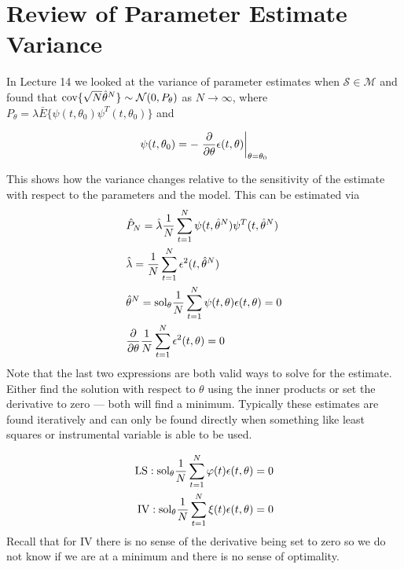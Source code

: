\mainmatter%
\setcounter{page}{1}

\lectureseries[\course]{\course}

\date{November 17, 2009}

\setaddress%

\setcounter{lecture}{14}
\setcounter{chapter}{14}


\section{Review of Parameter Estimate Variance}
In Lecture 14 we looked at the variance of parameter estimates when $\mathcal{S}\in\mathcal{M}$ and found that $\text{cov}\{\sqrt{N}\hat{\theta}^N\} \sim \mathcal{N}(0,P_\theta)$ as $N\to\infty$, where $P_\theta = \lambda\bar{E}\{\psi(t,\theta_0)\psi^T(t,\theta_0)\}$ and

\begin{equation*}
\psi(t,\theta_0) = -\left.\frac{\partial}{\partial\theta}\epsilon(t,\theta)\right|_{\theta=\theta_0}
\end{equation*}

This shows how the variance changes relative to the sensitivity of the estimate with respect to the parameters and the model.
This can be estimated via
\begin{align*}
&\hat{P}_N = \hat{\lambda}\frac{1}{N}\sum_{t=1}^N\psi(t,\hat{\theta}^N)\psi^T(t,\hat{\theta}^N) \\
&\hat{\lambda} = \frac{1}{N}\sum_{t=1}^N\epsilon^2(t,\hat{\theta}^N) \\
&\hat{\theta}^N = \text{sol}_\theta\frac{1}{N}\sum_{t=1}^N\psi(t,\theta)\epsilon(t,\theta) = 0 \\
&\frac{\partial}{\partial\theta}\frac{1}{N}\sum_{t=1}^N\epsilon^2(t,\theta) = 0
\end{align*}
Note that the last two expressions are both valid ways to solve for the estimate.
Either find the solution with respect to $\theta$ using the inner products or set the derivative to zero --- both will find a minimum.
Typically these estimates are found iteratively and can only be found directly when something like least squares or instrumental variable is able to be used.

\begin{align*}
\text{LS}: \text{sol}_\theta \frac{1}{N}\sum_{t=1}^N\varphi(t)\epsilon(t,\theta) = 0 \\
\text{IV}: \text{sol}_\theta \frac{1}{N}\sum_{t=1}^N\xi(t)\epsilon(t,\theta) = 0
\end{align*}
Recall that for IV there is no sense of the derivative being set to zero so we do not know if we are at a minimum and there is no sense of optimality.

